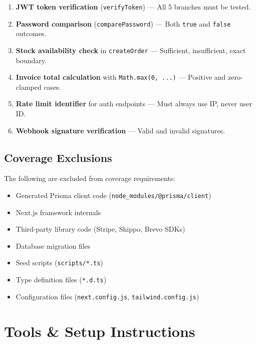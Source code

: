 \documentclass[12pt,a4paper]{report}
\begin{document}
\begin{tcolorbox}[criticalbox, title={Must-Have 100\% Branch Coverage}]
\begin{enumerate}
  \item \textbf{JWT token verification} (\texttt{verifyToken}) --- All 5 branches must be tested.
  \item \textbf{Password comparison} (\texttt{comparePassword}) --- Both \texttt{true} and \texttt{false} outcomes.
  \item \textbf{Stock availability check} in \texttt{createOrder} --- Sufficient, insufficient, exact boundary.
  \item \textbf{Invoice total calculation} with \texttt{Math.max(0, ...)} --- Positive and zero-clamped cases.
  \item \textbf{Rate limit identifier} for auth endpoints --- Must always use IP, never user ID.
  \item \textbf{Webhook signature verification} --- Valid and invalid signatures.
\end{enumerate}
\end{tcolorbox}

\section{Coverage Exclusions}

The following are excluded from coverage requirements:
\begin{itemize}
  \item Generated Prisma client code (\texttt{node\_modules/@prisma/client})
  \item Next.js framework internals
  \item Third-party library code (Stripe, Shippo, Brevo SDKs)
  \item Database migration files
  \item Seed scripts (\texttt{scripts/*.ts})
  \item Type definition files (\texttt{*.d.ts})
  \item Configuration files (\texttt{next.config.js}, \texttt{tailwind.config.js})
\end{itemize}

\chapter{Tools \& Setup Instructions}
\end{document}

